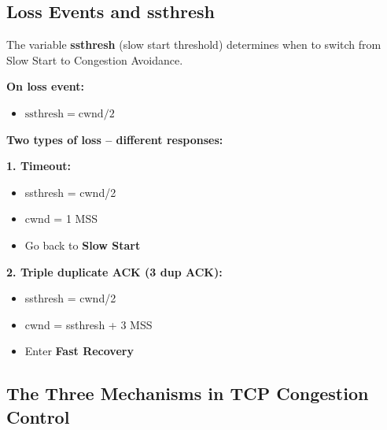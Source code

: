 \subsection{Loss Events and ssthresh}

\begin{keybox}
The variable \textbf{ssthresh} (slow start threshold) determines when to switch from Slow Start to Congestion Avoidance.

\textbf{On loss event:}
\begin{itemize}[noitemsep]
    \item $\text{ssthresh} = \text{cwnd} / 2$
\end{itemize}

\textbf{Two types of loss -- different responses:}

\textbf{1. Timeout:}
\begin{itemize}[noitemsep]
    \item ssthresh = cwnd/2
    \item cwnd = 1 MSS
    \item Go back to \textbf{Slow Start}
\end{itemize}

\textbf{2. Triple duplicate ACK (3 dup ACK):}
\begin{itemize}[noitemsep]
    \item ssthresh = cwnd/2
    \item cwnd = ssthresh + 3 MSS
    \item Enter \textbf{Fast Recovery}
\end{itemize}
\end{keybox}

\subsection{The Three Mechanisms in TCP Congestion Control}

